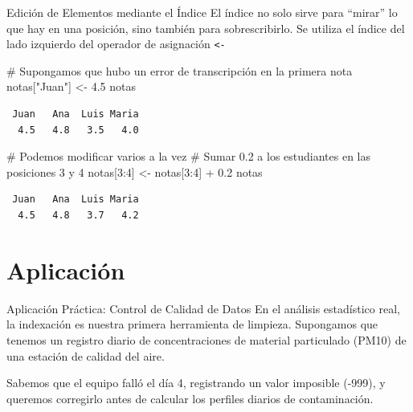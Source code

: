 \documentclass[
  ignorenonframetext,
  aspectratio=169,
  spanish,
]{beamer}
\newenvironment{Shaded}{\begin{snugshade}}{\end{snugshade}}
\newcommand{\CommentTok}[1]{\textcolor[rgb]{0.37,0.37,0.37}{#1}}
\newcommand{\DecValTok}[1]{\textcolor[rgb]{0.68,0.00,0.00}{#1}}
\newcommand{\FloatTok}[1]{\textcolor[rgb]{0.68,0.00,0.00}{#1}}
\newcommand{\NormalTok}[1]{\textcolor[rgb]{0.00,0.23,0.31}{#1}}
\newcommand{\OtherTok}[1]{\textcolor[rgb]{0.00,0.23,0.31}{#1}}
\newcommand{\SpecialCharTok}[1]{\textcolor[rgb]{0.37,0.37,0.37}{#1}}
\newcommand{\StringTok}[1]{\textcolor[rgb]{0.13,0.47,0.30}{#1}}
\begin{document}
\begin{frame}[fragile]{Edición de Elementos mediante el Índice}
\label{ediciuxf3n-de-elementos-mediante-el-uxedndice}
El índice no solo sirve para ``mirar'' lo que hay en una posición, sino
también para sobrescribirlo. Se utiliza el índice del lado izquierdo del
operador de asignación \texttt{\textless{}-}

\begin{Shaded}
\begin{Highlighting}[]
\CommentTok{\# Supongamos que hubo un error de transcripción en la primera nota}
\NormalTok{notas[}\StringTok{"Juan"}\NormalTok{] }\OtherTok{\textless{}{-}} \FloatTok{4.5}
\NormalTok{notas}
\end{Highlighting}
\end{Shaded}

\begin{verbatim}
 Juan   Ana  Luis Maria 
  4.5   4.8   3.5   4.0 
\end{verbatim}

\begin{Shaded}
\begin{Highlighting}[]
\CommentTok{\# Podemos modificar varios a la vez}
\CommentTok{\# Sumar 0.2 a los estudiantes en las posiciones 3 y 4}
\NormalTok{notas[}\DecValTok{3}\SpecialCharTok{:}\DecValTok{4}\NormalTok{] }\OtherTok{\textless{}{-}}\NormalTok{ notas[}\DecValTok{3}\SpecialCharTok{:}\DecValTok{4}\NormalTok{] }\SpecialCharTok{+} \FloatTok{0.2}
\NormalTok{notas}
\end{Highlighting}
\end{Shaded}

\begin{verbatim}
 Juan   Ana  Luis Maria 
  4.5   4.8   3.7   4.2 
\end{verbatim}
\end{frame}

\section{Aplicación}\label{aplicaciuxf3n}

\begin{frame}{Aplicación Práctica: Control de Calidad de Datos}
\label{aplicaciuxf3n-pruxe1ctica-control-de-calidad-de-datos}
En el análisis estadístico real, la indexación es nuestra primera
herramienta de limpieza. Supongamos que tenemos un registro diario de
concentraciones de material particulado (PM10) de una estación de
calidad del aire.

Sabemos que el equipo falló el día 4, registrando un valor imposible
(-999), y queremos corregirlo antes de calcular los perfiles diarios de
contaminación.
\end{frame}
\end{document}
